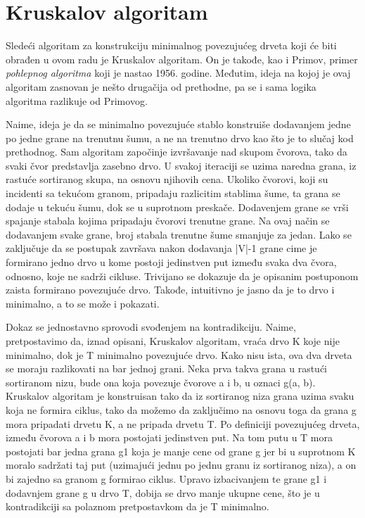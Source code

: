\documentclass[12pt,oneside]{memoir}
\begin{document}
\section{Kruskalov algoritam}
Sledeći algoritam za konstrukciju minimalnog povezujućeg drveta koji će biti obrađen u ovom radu je Kruskalov algoritam. On je takođe, kao i Primov, primer \textit{pohlepnog algoritma} koji je nastao 1956. godine. Međutim, ideja na kojoj je ovaj algoritam zasnovan je nešto drugačija od prethodne, pa se i sama logika algoritma razlikuje od Primovog.

Naime, ideja je da se minimalno povezujuće stablo konstruiše dodavanjem jedne po jedne grane na trenutnu šumu, a ne na trenutno drvo kao što je to slučaj kod prethodnog. Sam algoritam započinje izvršavanje nad skupom čvorova, tako da svaki čvor predstavlja zasebno drvo. U svakoj iteraciji se uzima naredna grana, iz rastuće sortiranog skupa, na osnovu njihovih cena. Ukoliko čvorovi, koji su incidenti sa tekućom granom, pripadaju razlicitim stablima šume, ta grana se dodaje u tekuću šumu, dok se u suprotnom preskače. Dodavenjem grane se vrši spajanje stabala kojima pripadaju čvorovi trenutne grane. Na ovaj način se dodavanjem svake grane, broj stabala trenutne šume smanjuje za jedan. Lako se zaključuje da se postupak završava nakon dodavanja |V|-1 grane cime je formirano jedno drvo u kome postoji jedinstven put između svaka dva čvora, odnosno, koje ne sadrži cikluse. Trivijano se dokazuje da je opisanim postuponom zaista formirano povezujuće drvo. Takođe, intuitivno je jasno da je to drvo i minimalno, a to se može i pokazati.

Dokaz se jednostavno sprovodi svođenjem na kontradikciju. Naime, pretpostavimo da, iznad opisani, Kruskalov algoritam, vraća drvo K koje nije minimalno, dok je T minimalno povezujuće drvo. Kako nisu ista, ova dva drveta se moraju razlikovati na bar jednoj grani. Neka prva takva grana u rastući sortiranom nizu, bude ona koja povezuje čvorove a i b, u oznaci g(a, b). Kruskalov algoritam je konstruisan tako da iz sortiranog niza grana uzima svaku koja ne formira ciklus, tako da možemo da zaključimo na osnovu toga da grana g mora pripadati drvetu K, a ne pripada drvetu T. Po definiciji povezujućeg drveta, između čvorova a i b mora postojati jedinstven put. Na tom putu u T mora postojati bar jedna grana g1 koja je manje cene od grane g jer bi u suprotnom K moralo sadržati taj put (uzimajući jednu po jednu granu iz sortiranog niza), a on bi zajedno sa granom g formirao ciklus. Upravo izbacivanjem te grane g1 i dodavnjem grane g u drvo T, dobija se drvo manje ukupne cene, što je u kontradikciji sa polaznom pretpostavkom da je T minimalno.
\end{document}
